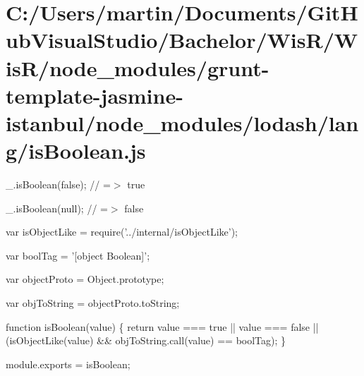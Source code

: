 \hypertarget{_c_1_2_users_2martin_2_documents_2_git_hub_visual_studio_2_bachelor_2_wis_r_2_wis_r_2node_modulef1cb52cf0bb5235039808e198e398dfe}{}\section{C\+:/\+Users/martin/\+Documents/\+Git\+Hub\+Visual\+Studio/\+Bachelor/\+Wis\+R/\+Wis\+R/node\+\_\+modules/grunt-\/template-\/jasmine-\/istanbul/node\+\_\+modules/lodash/lang/is\+Boolean.\+js}
\+\_\+.\+is\+Boolean(false); // =$>$ true

\+\_\+.\+is\+Boolean(null); // =$>$ false


\begin{DoxyCodeInclude}
var isObjectLike = require(\textcolor{stringliteral}{'../internal/isObjectLike'});

var boolTag = \textcolor{stringliteral}{'[object Boolean]'};

var objectProto = Object.prototype;

var objToString = objectProto.toString;

\textcolor{keyword}{function} isBoolean(value) \{
  \textcolor{keywordflow}{return} value === \textcolor{keyword}{true} || value === \textcolor{keyword}{false} || (isObjectLike(value) && objToString.call(value) == boolTag);
\}

module.exports = isBoolean;
\end{DoxyCodeInclude}
 